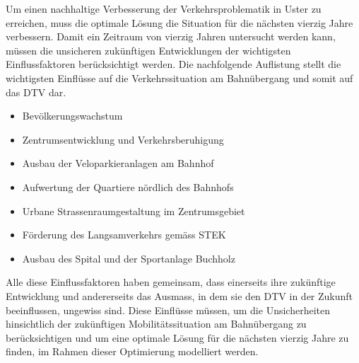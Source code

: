 %
%
%
%



Um einen nachhaltige Verbesserung der Verkehrsproblematik in Uster zu erreichen, muss die optimale Lösung die Situation für die nächsten vierzig Jahre verbessern. Damit ein Zeitraum von vierzig Jahren untersucht werden kann, müssen die unsicheren zukünftigen Entwicklungen der wichtigsten Einflussfaktoren berücksichtigt werden. Die nachfolgende Auflistung stellt die wichtigsten Einflüsse auf die Verkehrssituation am Bahnübergang und somit auf das DTV dar. 

{
\begin{itemize}
\item Bevölkerungswachstum
\item Zentrumsentwicklung und Verkehrsberuhigung
\item Ausbau der Veloparkieranlagen am Bahnhof 
\item Aufwertung der Quartiere nördlich des Bahnhofs
\item Urbane Strassenraumgestaltung im Zentrumsgebiet
\item Förderung des Langsamverkehrs gemäss STEK 
\item Ausbau des Spital und der Sportanlage Buchholz
\end{itemize}
}

Alle diese Einflussfaktoren haben gemeinsam, dass einerseits ihre zukünftige Entwicklung und andererseits das Ausmass, in dem sie den DTV in der Zukunft beeinflussen, ungewiss sind. Diese Einflüsse müssen, um die Unsicherheiten hinsichtlich der zukünftigen Mobilitätssituation am Bahnübergang zu berücksichtigen und um eine optimale Lösung für die nächsten vierzig Jahre zu finden, im Rahmen dieser Optimierung modelliert werden. 

